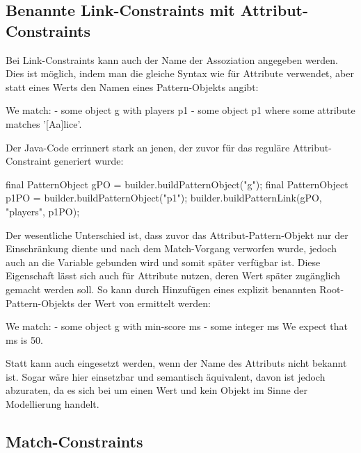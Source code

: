 \subsection{Benannte Link-Constraints mit Attribut-Constraints}

Bei Link-Constraints kann auch der Name der Assoziation angegeben werden.
Dies ist möglich, indem man die gleiche Syntax wie für Attribute verwendet,
aber statt eines Werts den Namen eines Pattern-Objekts angibt:

\begin{mdcodeblock}
    We match:
    - some object g with players p1
    - some object p1 where some attribute matches '[Aa]lice'.
\end{mdcodeblock}

Der Java-Code errinnert stark an jenen, der zuvor für das reguläre Attribut-Constraint generiert wurde:

\begin{jcodeblock}
    final PatternObject gPO = builder.buildPatternObject("g");
    final PatternObject p1PO = builder.buildPatternObject("p1");
    builder.buildPatternLink(gPO, "players", p1PO);
\end{jcodeblock}

Der wesentliche Unterschied ist, dass zuvor das Attribut-Pattern-Objekt  nur der Einschränkung diente und nach dem Match-Vorgang verworfen wurde,
 jedoch auch an die Variable  gebunden wird und somit später verfügbar ist.
Diese Eigenschaft lässt sich auch für Attribute nutzen, deren Wert später zugänglich gemacht werden soll.
So kann durch Hinzufügen eines explizit benannten Root-Pattern-Objekts der Wert von  ermittelt werden:

\begin{mdcodeblock}
    We match:
    - some object g with min-score ms
    - some integer ms
    We expect that ms is 50.
\end{mdcodeblock}

Statt  kann auch  eingesetzt werden, wenn der Name des Attributs nicht bekannt ist.
Sogar  wäre hier einsetzbar und semantisch äquivalent,
davon ist jedoch abzuraten, da es sich bei  um einen Wert und kein Objekt im Sinne der Modellierung handelt.

\subsection{Match-Constraints}

